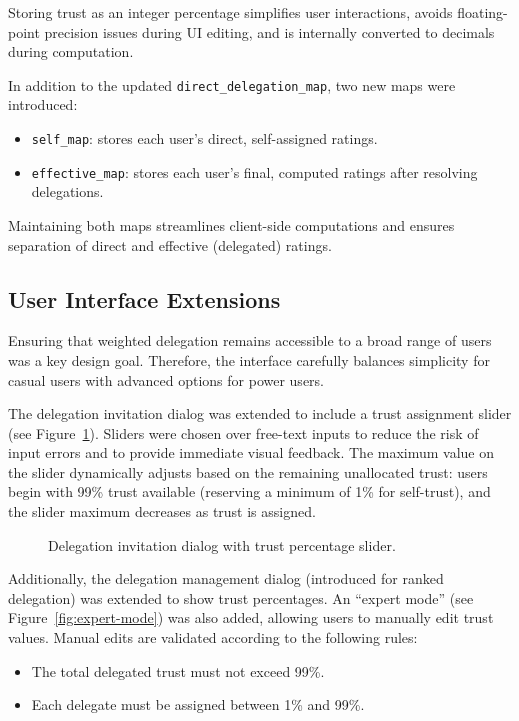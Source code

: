 Storing trust as an integer percentage simplifies user interactions, avoids floating-point precision issues during UI editing, and is internally converted to decimals during computation.

In addition to the updated \texttt{direct\_delegation\_map}, two new maps were introduced:
\begin{itemize}
    \item \texttt{self\_map}: stores each user's direct, self-assigned ratings.
    \item \texttt{effective\_map}: stores each user's final, computed ratings after resolving delegations.
\end{itemize}

Maintaining both maps streamlines client-side computations and ensures separation of direct and effective (delegated) ratings.

\subsection{User Interface Extensions}

Ensuring that weighted delegation remains accessible to a broad range of users was a key design goal. Therefore, the interface carefully balances simplicity for casual users with advanced options for power users.

The delegation invitation dialog was extended to include a trust assignment slider (see Figure~\ref{fig:trust-slider}). Sliders were chosen over free-text inputs to reduce the risk of input errors and to provide immediate visual feedback. The maximum value on the slider dynamically adjusts based on the remaining unallocated trust: users begin with 99\% trust available (reserving a minimum of 1\% for self-trust), and the slider maximum decreases as trust is assigned.

\begin{figure}[h]
    \centering
    \caption{Delegation invitation dialog with trust percentage slider.}
    \label{fig:trust-slider}
\end{figure}

Additionally, the delegation management dialog (introduced for ranked delegation) was extended to show trust percentages. An ``expert mode'' (see Figure~\ref{fig:expert-mode}) was also added, allowing users to manually edit trust values. Manual edits are validated according to the following rules:
\begin{itemize}
    \item The total delegated trust must not exceed 99\%.
    \item Each delegate must be assigned between 1\% and 99\%.
\end{itemize}

